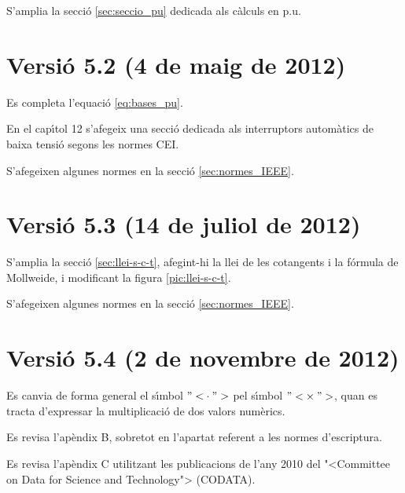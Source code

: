 S'amplia la secci\'{o} \ref{sec:seccio_pu} dedicada als c\`{a}lculs en p.u.


\section*{Versi\'{o} 5.2 (4 de maig de 2012)}

Es completa l'equaci\'{o} \eqref{eq:bases_pu}.

En el cap\'{\i}tol 12 s'afegeix una secci\'{o} dedicada als interruptors autom\`{a}tics de baixa tensi\'{o} segons les normes \textsf{CEI}.

S'afegeixen algunes normes en la secci\'{o} \ref{sec:normes_IEEE}.

\section*{Versi\'{o} 5.3 (14 de juliol de 2012)}

S'amplia la secci\'{o} \ref{sec:llei-s-c-t}, afegint-hi la llei de les cotangents i la f\'{o}rmula de Mollweide, i modificant  la figura \ref{pic:llei-s-c-t}.

S'afegeixen algunes normes en la secci\'{o} \ref{sec:normes_IEEE}.

\section*{Versi\'{o} 5.4 (2 de novembre de 2012)}

Es canvia de forma general el s\'{\i}mbol ${"<}\cdot{">}$ pel s\'{\i}mbol ${"<}\times{">}$, quan es tracta d'expressar la multiplicaci\'{o} de dos valors num\`{e}rics.

Es revisa l'ap\`{e}ndix B, sobretot en l'apartat referent a les normes d'escriptura.

Es revisa l'ap\`{e}ndix C utilitzant les publicacions de l'any 2010 del {"<}Committee on Data for Science and Technology{">} (\textsf{CODATA}).
